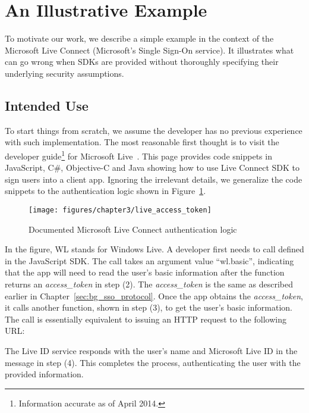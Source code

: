 \section{An Illustrative Example}
\label{sec:explicating_illustrative_example}

To motivate our work, we describe a simple example in the context of the Microsoft Live Connect (Microsoft's Single Sign-On service). It illustrates what can go wrong when SDKs are provided without thoroughly specifying their underlying security assumptions.   

\subsection{Intended Use}

To start things from scratch, we assume the developer has no previous experience with such implementation.  The most reasonable first thought is to visit the developer guide\footnote{Information accurate as of April 2014.} for Microsoft Live~\cite{LiveConnectDoc}.  This page provides code snippets in JavaScript, C\#, Objective-C and Java showing how to use Live Connect SDK to sign users into a client app.  Ignoring the irrelevant details, we generalize the code snippets to the authentication logic shown in Figure~\ref{fig:live_access_token}.

\begin{figure}[hbt]
\centering
\texttt{[image: figures/chapter3/live\_access\_token]}
\caption{Documented Microsoft Live Connect authentication logic}
\label{fig:live_access_token}
\end{figure}

In the figure, WL stands for Windows Live. A developer first needs to call  defined in the JavaScript SDK. The call takes an argument value ``wl.basic'', indicating that the app will need to read the user's basic information after the function returns an \emph{access\_token} in step (2).  The \emph{access\_token} is the same as described earlier in Chapter~\ref{sec:bg_sso_protocol}.  Once the app obtains the \emph{access\_token}, it calls another function, shown in step (3), to get the user's basic information.  The call is essentially equivalent to issuing an HTTP request to the following URL:

\setlength{\fboxrule}{0pt}

The Live ID service responds with the user's name and Microsoft Live ID in the message in step (4). This completes the process, authenticating the user with the provided information. 

